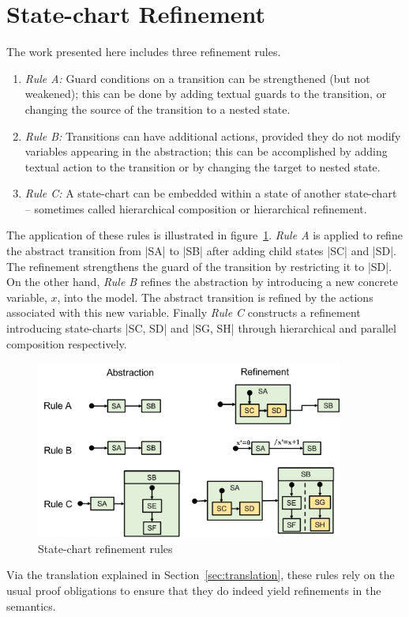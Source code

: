 \section{State-chart Refinement}
\label{sec:refinement-rules}

The work presented here includes three refinement rules.
\begin{enumerate}
\item  \emph{Rule A:} Guard conditions on a transition can be strengthened (but not weakened); 
this can be done by adding textual guards to the transition, or
changing the source of the transition to a nested state.
\item \emph{Rule B:} Transitions can have additional actions, provided they do not
  modify variables appearing in the abstraction; this can be 
  accomplished by adding textual action to the transition 
  or by changing the target to nested state.
\item \emph{Rule C:} A state-chart can be embedded within a state of another
  state-chart -- sometimes called hierarchical composition or
  hierarchical refinement.
\end{enumerate}

The application of these rules is illustrated in figure~\ref{fig:ref-rules}.
\emph{Rule A} is applied to refine the abstract transition from |SA| to |SB| after adding 
child states |SC| and |SD|. The refinement strengthens the guard of the transition 
by restricting it to |SD|. On the other hand, \emph{Rule B} refines the abstraction 
by introducing a new concrete variable, $x$, into the model. The abstract transition is refined 
by the actions associated with this new variable. Finally \emph{Rule C} constructs a refinement 
introducing state-charts |SC, SD| and |SG, SH| through hierarchical and parallel composition respectively.

\begin{figure}[]
	\centering
	\includegraphics[width=0.90\textwidth]{figures/RefinementRules.png}
	\caption{State-chart refinement rules}
	\label{fig:ref-rules}
\end{figure} 

Via the translation explained in Section~\ref{sec:translation}, these
rules rely on the usual \EventB proof obligations to ensure that they
do indeed yield refinements in the \EventB semantics.